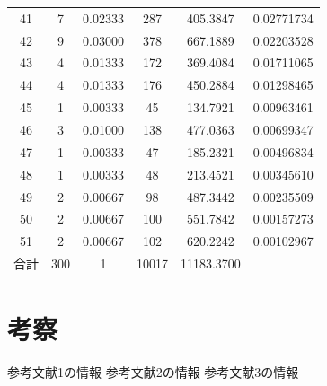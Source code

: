 \documentclass{jarticle}
\begin{document}
\begin{table}[H]
\begin{tabular}{cccccc}
    41 & 7 & 0.02333 & 287 & 405.3847 & 0.02771734 \\
    42 & 9 & 0.03000 & 378 & 667.1889 & 0.02203528 \\
    43 & 4 & 0.01333 & 172 & 369.4084 & 0.01711065 \\
    44 & 4 & 0.01333 & 176 & 450.2884 & 0.01298465 \\
    45 & 1 & 0.00333 & 45 & 134.7921 & 0.00963461 \\
    46 & 3 & 0.01000 & 138 & 477.0363 & 0.00699347 \\
    47 & 1 & 0.00333 & 47 & 185.2321 & 0.00496834 \\
    48 & 1 & 0.00333 & 48 & 213.4521 & 0.00345610 \\
    49 & 2 & 0.00667 & 98 & 487.3442 & 0.00235509 \\
    50 & 2 & 0.00667 & 100 & 551.7842 & 0.00157273 \\
    51 & 2 & 0.00667 & 102 & 620.2242 & 0.00102967 \\
    \hline
    合計 & 300 & 1 & 10017 & 11183.3700 & \\
    \end{tabular}
\end{table}



\section{考察}





\begin{thebibliography}{99}

   参考文献1の情報
   参考文献2の情報
   参考文献3の情報

\end{thebibliography}
\end{document}
